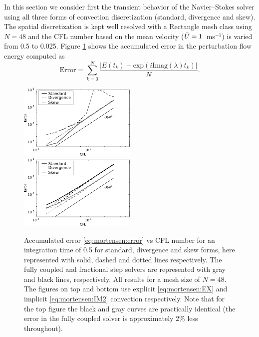 In this section we consider first the transient behavior of the
Navier--Stokes solver using all three forms of convection discretization
(standard, divergence and skew). The spatial discretization is kept
well resolved with a Rectangle mesh class using $N=48$ and the CFL number
based on the mean velocity ($\Bar{U}=1$~ms$^{-1}$) is varied from 0.5
to 0.025. Figure \ref{fig:mortensen:OS_init_cfl} shows the accumulated
error in the perturbation flow energy computed as
\begin{equation}
 \text{Error} = \sum_{k=0}^N \frac{|E(t_k)-\text{exp}(i \text{Imag}(\lambda) t_k)|}{N}.
 \label{eq:mortensen:error}
\end{equation}
\begin{figure}
 \includegraphics[width=0.5\textwidth]{chapters/mortensen/pdf/OS_init_cfl_1.pdf}
 \includegraphics[width=0.5\textwidth]{chapters/mortensen/pdf/OS_init_cfl_0.pdf}
 \caption{Accumulated error \eqref{eq:mortensen:error} vs CFL number
   for an integration time of 0.5 for standard, divergence and skew
   forms, here represented with solid, dashed and dotted lines
   respectively. The fully coupled and fractional step solvers are
   represented with gray and black lines, respectively. All results
   for a mesh size of $N=48$. The figures on top and bottom
   use explicit \eqref{eq:mortensen:EX} and implicit \eqref{eq:mortensen:IM2}
   convection respectively. Note that for the top figure the black and gray curves
   are practically identical (the error in the fully coupled solver is
   approximately 2\% less throughout). }
\label{fig:mortensen:OS_init_cfl}
\end{figure}
